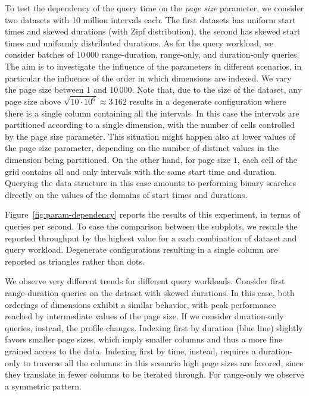 \documentclass[sigconf,nonacm,anonymous]{acmart}
\theoremstyle{definition}
\newcommand{\qrd}{range-duration\xspace}
\newcommand{\qdo}{duration-only\xspace}
\newcommand{\qro}{range-only\xspace}
\begin{document}
To test the dependency of the query time on the \emph{page size} parameter, 
we consider two datasets with 10 million intervals each. The first datasets has 
uniform start times and skewed durations (with Zipf distribution), the second
has skewed start times and uniformly distributed durations.
As for the query workload, we consider batches of 10\,000 \qrd, \qro, and \qdo queries.
The aim is to investigate the influence of the parameters in different scenarios, in particular the influence
of the order in which dimensions are indexed.
We vary the page size between 1 and 10\,000. Note that, due to the size of the dataset, any page size above 
$\sqrt{10\cdot 10^6} \approx 3\,162$ results in a degenerate configuration where
there is a single column containing all the intervals. In this case the intervals are 
partitioned according to a single dimension, with the number of cells controlled by the page size parameter.
This situation might happen also at lower values of the page size parameter, depending on the number 
of distinct values in the dimension being partitioned.
On the other hand, for page size $1$, each cell of the grid contains all and only intervals with the
same start time and duration. Querying the data structure in this case amounts to performing binary searches
directly on the values of the domains of start times and durations.

Figure~\ref{fig:param-dependency} reports the results of this experiment,
in terms of queries per second. To ease the comparison between the subplots, we rescale
the reported throughput by the highest value for a each combination of dataset and query workload.
Degenerate configurations resulting in a single column are reported as triangles rather than dots.

We observe very different trends for different query workloads.
Consider first \qrd queries on the dataset with skewed durations.
In this case, both orderings of dimensions exhibit a similar behavior, with peak performance
reached by intermediate values of the page size.
If we consider \qdo queries, instead, the profile changes. Indexing first by duration (blue line) slightly
favors smaller page sizes, which imply smaller columns and thus a more fine grained access to the data.
Indexing first by time, instead, requires a \qdo to traverse all the columns: in this scenario high page 
sizes are favored, since they translate in fewer columns to be iterated through.
For \qro we observe a symmetric pattern.
\end{document}
